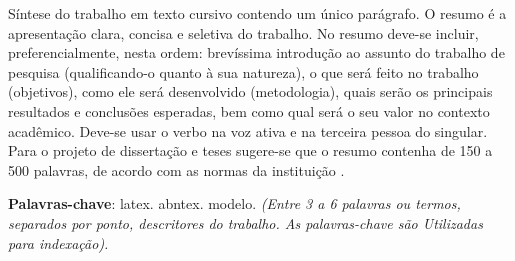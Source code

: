 %
%


\begin{center}
\imprimirtitulo
\end{center}

\begin{resumo}
Síntese do trabalho em texto cursivo contendo um único parágrafo. O resumo é a apresentação clara, concisa e seletiva do trabalho. No resumo deve-se incluir, preferencialmente, nesta ordem: brevíssima introdução ao assunto do trabalho de pesquisa (qualificando-o quanto à sua natureza), o que será feito no trabalho (objetivos), como ele será desenvolvido (metodologia), quais serão os principais resultados e conclusões esperadas, bem como qual será o seu valor no contexto acadêmico. Deve-se usar o verbo na voz ativa e na terceira pessoa do singular. Para o projeto de dissertação e teses sugere-se que o resumo contenha de 150 a 500 palavras, de acordo com as normas da instituição \cite{normasuesc}. 

\textbf{Palavras-chave}: latex. abntex. modelo.
 \textit{(Entre 3 a 6 palavras ou termos, separados por ponto, descritores do trabalho. As palavras-chave são Utilizadas para indexação).}

\end{resumo}
